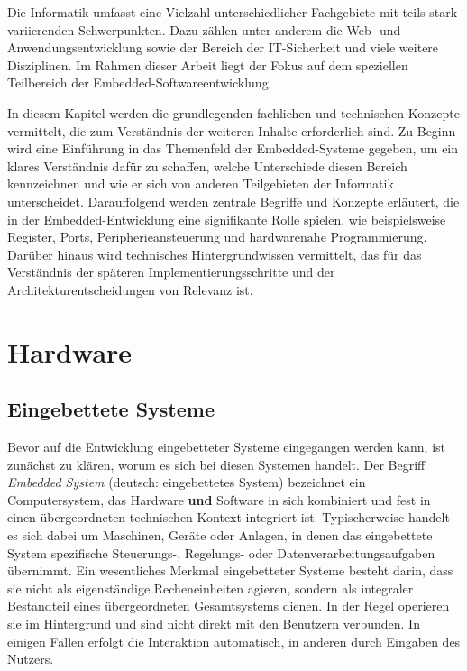 
Die Informatik umfasst eine Vielzahl unterschiedlicher Fachgebiete mit teils stark variierenden Schwerpunkten. 
Dazu zählen unter anderem die Web- und Anwendungsentwicklung sowie der Bereich der IT-Sicherheit und viele weitere Disziplinen. 
Im Rahmen dieser Arbeit liegt der Fokus auf dem speziellen Teilbereich der Embedded-Softwareentwicklung.

In diesem Kapitel werden die grundlegenden fachlichen und technischen Konzepte vermittelt, die zum Verständnis der weiteren Inhalte erforderlich sind.
Zu Beginn wird eine Einführung in das Themenfeld der Embedded-Systeme gegeben, um ein klares Verständnis dafür zu schaffen, welche Unterschiede diesen Bereich kennzeichnen und wie er sich von anderen Teilgebieten der Informatik unterscheidet.
Darauffolgend werden zentrale Begriffe und Konzepte erläutert, die in der Embedded-Entwicklung eine signifikante Rolle spielen, wie beispielsweise Register, Ports, Peripherieansteuerung und hardwarenahe Programmierung.
Darüber hinaus wird technisches Hintergrundwissen vermittelt, das für das Verständnis der späteren Implementierungsschritte und der Architekturentscheidungen von Relevanz ist.

\section{Hardware}
\subsection{Eingebettete Systeme}
Bevor auf die Entwicklung eingebetteter Systeme eingegangen werden kann, ist zunächst zu klären, worum es sich bei diesen Systemen handelt.
Der Begriff \emph{Embedded System} (deutsch: eingebettetes System) bezeichnet ein Computersystem, das Hardware \textbf{und} Software in sich kombiniert und fest in einen übergeordneten technischen Kontext integriert ist. 
Typischerweise handelt es sich dabei um Maschinen, Geräte oder Anlagen, in denen das eingebettete System spezifische Steuerungs-, Regelungs- oder Datenverarbeitungsaufgaben übernimmt.
Ein wesentliches Merkmal eingebetteter Systeme besteht darin, dass sie nicht als eigenständige Recheneinheiten agieren, sondern als integraler Bestandteil eines übergeordneten Gesamtsystems dienen.
In der Regel operieren sie im Hintergrund und sind nicht direkt mit den Benutzern verbunden. In einigen Fällen erfolgt die Interaktion automatisch, in anderen durch Eingaben des Nutzers.

